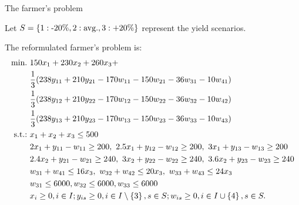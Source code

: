 \begin{frame}{The farmer's problem {\small \cite{birge2011introduction}}}
	
	Let $S = \left\{ 1: \text{-20\%}, 2: \text{avg.}, 3:\text{+20\%} \right \}$ represent the \alert{yield scenarios}. 
	
	\pause
	The reformulated farmer's problem is:
	{\small
	\begin{align*}
		\mathop{\text{min.} \ } & 150x_1 + 230 x_2 + 260 x_3 +~ \\
		& \frac{1}{3} (238 y_{11} + 210 y_{21} - 170 w_{11} - 150 w_{21} - 36 w_{31} - 10w_{41})\\
		& \frac{1}{3} (238 y_{12} + 210 y_{22} - 170 w_{12} - 150 w_{22} - 36 w_{32} - 10w_{42})\\
		& \frac{1}{3} (238 y_{13} + 210 y_{23} - 170 w_{13} - 150 w_{23} - 36 w_{33} - 10w_{43})\\
		\text{s.t.:~} & x_1 + x_2 + x_3 \le 500 \\
		&2x_1 + y_{11} - w_{11} \ge 200, \ 2.5x_1 + y_{12} - w_{12} \ge 200, \ 3x_1 + y_{13} - w_{13} \ge 200 \\
		& 2.4 x_2 + y_{21} - w_{21} \ge 240, \ 3 x_2 + y_{22} - w_{22} \ge 240, \ 3.6 x_2 + y_{23} - w_{23} \ge 240 \\
		& w_{31} + w_{41} \le 16x_3, \ w_{32} + w_{42} \le 20x_3, \ w_{33} + w_{43} \le 24x_3 \\
		& w_{31} \le 6000, w_{32} \le 6000, w_{33} \le 6000 \\
		& x_i \ge 0, i \in I; y_{is} \ge 0, i \in I \setminus \left\{ 3 \right \}, s \in S; w_{is} \ge 0, i \in I \cup \left\{ 4 \right \}, s \in S.
	\end{align*}
	}
\end{frame}



